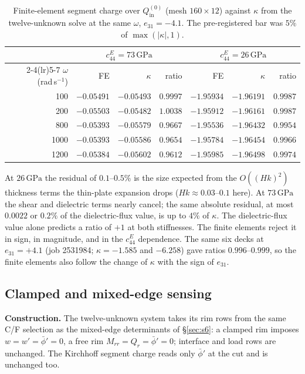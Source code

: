 \documentclass[11pt]{article}
\begin{document}
\begin{table}[h]
\centering
\caption{Finite-element segment charge over $Q_{\mathrm{in}}^{(0)}$
(mesh $160\times12$) against $\kappa$ from the twelve-unknown solve at
the same $\omega$, $e_{31}=-4.1$. The pre-registered bar was $5\%$ of
$\max(\lvert\kappa\rvert,1)$.}
\label{tab:segfe}
\begin{tabular}{rrrrrrr}
\toprule
 & \multicolumn{3}{c}{$c_{44}^E=73\,\mathrm{GPa}$} & \multicolumn{3}{c}{$c_{44}^E=26\,\mathrm{GPa}$}\\
\cmidrule(lr){2-4}\cmidrule(lr){5-7}
$\omega$ (rad\,s$^{-1}$) & FE & $\kappa$ & ratio & FE & $\kappa$ & ratio\\
\midrule
100  & $-0.05491$ & $-0.05493$ & $0.9997$ & $-1.95934$ & $-1.96191$ & $0.9987$\\
200  & $-0.05503$ & $-0.05482$ & $1.0038$ & $-1.95912$ & $-1.96161$ & $0.9987$\\
800  & $-0.05393$ & $-0.05579$ & $0.9667$ & $-1.95536$ & $-1.96432$ & $0.9954$\\
1000 & $-0.05393$ & $-0.05586$ & $0.9654$ & $-1.95784$ & $-1.96454$ & $0.9966$\\
1200 & $-0.05384$ & $-0.05602$ & $0.9612$ & $-1.95985$ & $-1.96498$ & $0.9974$\\
\bottomrule
\end{tabular}
\end{table}

At $26\,\mathrm{GPa}$ the residual of $0.1$--$0.5\%$ is the size
expected from the $O((Hk)^2)$ thickness terms the thin-plate expansion
drops ($Hk\approx0.03$--$0.1$ here). At $73\,\mathrm{GPa}$ the shear and
dielectric terms nearly cancel; the same absolute residual, at most
$0.0022$ or $0.2\%$ of the dielectric-flux value, is up to $4\%$ of
$\kappa$. The dielectric-flux value alone predicts a ratio of $+1$ at
both stiffnesses. The finite elements reject it in sign, in magnitude,
and in the $c_{44}^E$ dependence. The same six decks at $e_{31}=+4.1$
(job 2531984; $\kappa=-1.585$ and $-6.258$) gave ratios $0.996$--$0.999$,
so the finite elements also follow the change of $\kappa$ with the sign
of $e_{31}$.

\subsection{Clamped and mixed-edge sensing}
\label{sec:s7mixed}
\textbf{Construction.} The twelve-unknown system takes its rim rows from
the same C/F selection as the mixed-edge determinants of
\S\ref{sec:s6}: a clamped rim imposes $w=w'=\bar\phi'=0$, a free rim
$M_{rr}=Q_r=\bar\phi'=0$; interface and load rows are unchanged. The
Kirchhoff segment charge reads only $\bar\phi'$ at the cut and is
unchanged too.
\end{document}
